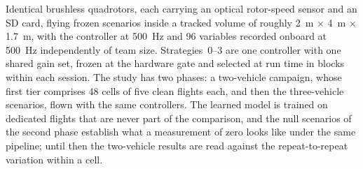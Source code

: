 Identical brushless quadrotors, each carrying an optical rotor-speed sensor and an SD card, flying
frozen scenarios inside a tracked volume of roughly \SI{2}{\metre} $\times$ \SI{4}{\metre} $\times$
\SI{1.7}{\metre}, with the controller at \SI{500}{\hertz} and \num{96} variables recorded onboard at
\SI{500}{\hertz} independently of team size. Strategies~0--3 are one controller with one shared gain
set, frozen at the hardware gate and selected at run time in blocks within each session. The study
has two phases: a two-vehicle campaign, whose first tier comprises 48 cells of five clean flights
each, and then the three-vehicle scenarios, flown with the same controllers. The learned model is
trained on dedicated flights that are never part of the comparison, and the null scenarios of the
second phase establish what a measurement of zero looks like under the same pipeline; until then the
two-vehicle results are read against the repeat-to-repeat variation within a cell.

